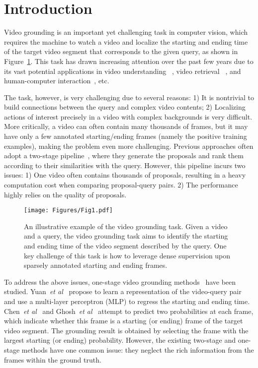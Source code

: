 \documentclass[10pt,twocolumn,letterpaper]{article}
\def\etal{\emph{et al}\onedot}
\begin{document}
	\section{Introduction}
	
	Video grounding is an important yet challenging task in computer vision, which requires the machine to watch a video and localize the starting and ending time of the target video segment that corresponds to the given query, as shown in Figure~\ref{fig:Brief}. This task has drawn increasing attention over the past few years due to its vast potential applications in video understanding ~\cite{wang2016temporal, carreira2017quo,zeng2019graph,zeng2019breaking,chen2019relation}, video retrieval ~\cite{yu2018a, dong2019dual}, and human-computer interaction~\cite{singha2018dynamic,huang2020graph,zhu2019auxrn}, etc.




 The task, however, is very challenging due to several reasons: 1) It is nontrivial to build connections between the query and complex video contents; 2) Localizing actions of interest precisely in a video with complex backgrounds is very difficult. More critically, a video can often contain many thousands of frames, but it  may have only a few annotated starting/ending frames (namely the positive training examples), making the problem even more challenging.
    Previous approaches often adopt a two-stage pipeline~\cite{gao2017tall, xu2019multilevel, ge2019mac}, where they generate the proposals and rank them according to their similarities with the query. However, this pipeline incurs two issues: 1) One video often contains thousands of proposals, resulting in a heavy computation cost when comparing proposal-query pairs.
	2) The performance highly relies on the quality of proposals. 
\begin{figure}[!t]
		\centering
		\texttt{[image: Figures/Fig1.pdf]}
\caption{An illustrative example of the video grounding task. Given a video and a query, the video grounding task aims to identify the starting and ending time of the video segment described by the query. One key challenge  of this task is how to leverage dense supervision upon sparsely annotated starting and ending frames.}
		\label{fig:Brief}
		\vspace{-0.15in}
	\end{figure}
	To address the above issues, one-stage video grounding methods~\cite{chen2019localizing,yuan2019to,ghosh2019excl} have been studied. Yuan~\etal~\cite{yuan2019to} propose to learn a representation of the video-query pair and use a multi-layer perceptron (MLP) to regress the starting and ending time. 
	Chen~\etal~\cite{chen2019localizing} and Ghosh~\etal~\cite{ghosh2019excl} attempt to predict two probabilities at each frame, which indicate whether this frame is a starting (or ending) frame of the target video segment. 
	The grounding result is obtained by selecting the frame with the largest starting (or ending) probability.
However, the existing two-stage and one-stage methods have one common issue: they neglect the rich information from the frames within the ground truth.
\end{document}
